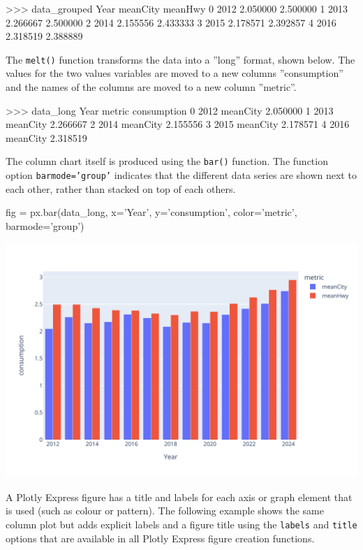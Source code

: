 \begin{textcode}
>>> data_grouped
    Year  meanCity   meanHwy
0   2012  2.050000  2.500000
1   2013  2.266667  2.500000
2   2014  2.155556  2.433333
3   2015  2.178571  2.392857
4   2016  2.318519  2.388889
\end{textcode}

The \texttt{melt()} function transforms the data into a ''long'' format, shown below. The values for the two values variables are moved to a new columns ''consumption'' and the names of the columns are moved to a new column ''metric''. 

\begin{textcode}
>>> data_long
    Year    metric  consumption
0   2012  meanCity     2.050000
1   2013  meanCity     2.266667
2   2014  meanCity     2.155556
3   2015  meanCity     2.178571
4   2016  meanCity     2.318519
\end{textcode}

The column chart itself is produced using the \texttt{bar()} function. The function option \texttt{barmode='group'} indicates that the different data series are shown next to each other, rather than stacked on top of each others.

\begin{pythoncode}
fig = px.bar(data_long, 
   x='Year', y='consumption', color='metric', 
   barmode='group')
\end{pythoncode}

\begin{center}
  \includegraphics[width=.8\textwidth]{px.fuel.columns.pdf}
\end{center}

A Plotly Express figure has a title and labels for each axis or graph element that is used (such as colour or pattern). The following example shows the same column plot but adds explicit labels and a figure title using the \texttt{labels} and \texttt{title} options that are available in all Plotly Express figure creation functions.

